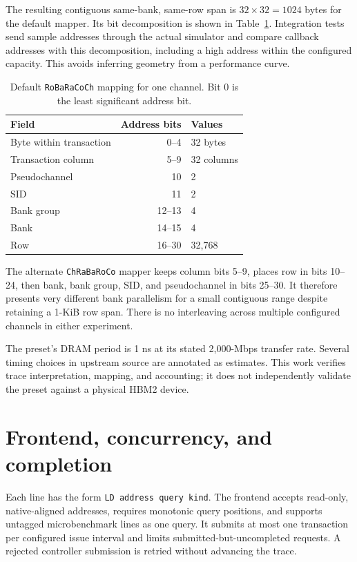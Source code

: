 \documentclass[11pt,a4paper]{report}
\begin{document}
The resulting contiguous same-bank, same-row span is $32\times32=1024$ bytes for the default mapper. Its bit decomposition is shown in Table~\ref{tab:bits}. Integration tests send sample addresses through the actual simulator and compare callback addresses with this decomposition, including a high address within the configured capacity. This avoids inferring geometry from a performance curve.

\begin{table}[htbp]\centering
\caption[Default address mapping]{Default \texttt{RoBaRaCoCh} mapping for one channel. Bit 0 is the least significant address bit.}\label{tab:bits}
\begin{tabular}{lrl}\toprule
Field & Address bits & Values\\\midrule
Byte within transaction & 0--4 & 32 bytes\\
Transaction column & 5--9 & 32 columns\\
Pseudochannel & 10 & 2\\
SID & 11 & 2\\
Bank group & 12--13 & 4\\
Bank & 14--15 & 4\\
Row & 16--30 & 32,768\\\bottomrule
\end{tabular}
\end{table}

The alternate \texttt{ChRaBaRoCo} mapper keeps column bits 5--9, places row in bits 10--24, then bank, bank group, SID, and pseudochannel in bits 25--30. It therefore presents very different bank parallelism for a small contiguous range despite retaining a 1-KiB row span. There is no interleaving across multiple configured channels in either experiment.

The preset's DRAM period is 1 ns at its stated 2,000-Mbps transfer rate. Several timing choices in upstream source are annotated as estimates. This work verifies trace interpretation, mapping, and accounting; it does not independently validate the preset against a physical HBM2 device.

\section{Frontend, concurrency, and completion}
\label{sec:frontend}
Each line has the form \texttt{LD address query kind}. The frontend accepts read-only, native-aligned addresses, requires monotonic query positions, and supports untagged microbenchmark lines as one query. It submits at most one transaction per configured issue interval and limits submitted-but-uncompleted requests. A rejected controller submission is retried without advancing the trace.
\end{document}

